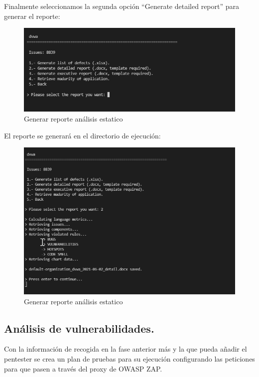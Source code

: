 Finalmente seleccionamos la segunda opción “Generate detailed report” para generar el reporte:

\begin{figure}[h!]  
    \includegraphics[width=\linewidth]{./imagenes/017_SonarQubeReportTool_3.png}
    \caption{Generar reporte análisis estatico}  
    \label{fig:17}
\end{figure}

El reporte se generará en el directorio de ejecución:

\begin{figure}[h!] 
    \captionsetup{width=1\linewidth}   
    \includegraphics[width=\linewidth]{./imagenes/017_SonarQubeReportTool_4.png}
    \caption{Generar reporte análisis estatico}  
    \label{fig:18}
\end{figure}


\subsection{Análisis de vulnerabilidades.}
Con la información de recogida en la fase anterior más y la que pueda añadir el pentester se crea un plan de pruebas 
para su ejecución configurando las peticiones para que pasen a través del proxy de OWASP ZAP.


